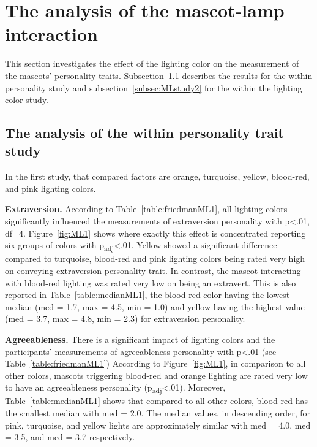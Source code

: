\section{The analysis of the mascot-lamp interaction}
\label{sec:m-l}
This section investigates the effect of the lighting color on the measurement of the mascots' personality traits.
Subsection~\ref{subsec:MLstudy1} describes the results for the within personality study and
subsection~\ref{subsec:MLstudy2} for the within the lighting color study.

\subsection{The analysis of the within personality trait study}
\label{subsec:MLstudy1}
In the first study, that compared factors are orange, turquoise, yellow, blood-red, and pink lighting colors.

\par\textbf{Extraversion.}
According to Table~\ref{table:friedmanML1}, all lighting colors significantly
influenced the measurements of extraversion personality with p<.01, df=4.
Figure~\ref{fig:ML1} shows where exactly this effect is concentrated
reporting six groups of colors with p\textsubscript{adj}<.01.
Yellow showed a significant difference compared to turquoise, blood-red and pink lighting colors
being rated very high on conveying extraversion personality trait.
In contrast, the mascot interacting with blood-red lighting was rated very low on being an extravert.
This is also reported in Table~\ref{table:medianML1}, the blood-red color having
the lowest median (med = 1.7, max = 4.5, min = 1.0) and yellow having the highest
value (med = 3.7, max = 4.8, min = 2.3) for extraversion personality.

\par\textbf{Agreeableness.}
There is a significant impact of lighting colors and the participants'
measurements of agreeableness personality with p<.01 (see Table~\ref{table:friedmanML1})
According to Figure~\ref{fig:ML1}, in comparison to all other colors,
mascots triggering blood-red and orange lighting
are rated very low to have an agreeableness personality (p\textsubscript{adj}<.01).
Moreover, Table~\ref{table:medianML1} shows that compared to all other colors,
blood-red has the smallest median with med = 2.0.
The median values, in descending order, for pink, turquoise, and yellow lights are
approximately similar with med = 4.0, med = 3.5, and med = 3.7 respectively.

